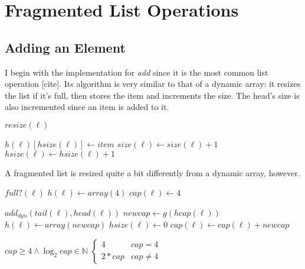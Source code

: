 \documentclass{article}
\begin{document}
	\section{Fragmented List Operations}
	\label{Fragmented List Operations}
	
	\subsection{Adding an Element}
	
	I begin with the implementation for \textit{add} since it is the most common list operation [cite]. Its algorithm is very similar to that of a dynamic array: it resizes the list if it's full, then stores the item and increments the size. The head's size is also incremented since an item is added to it.
	
	\begin{algorithm}\begin{algorithmic}[1]
					\State $resize(\ell)$
				\EndIf
				
				\State $h(\ell)[hsize(\ell)] \gets item$
				\State $size(\ell) \gets size(\ell) + 1$
				\State $hsize(\ell) \gets hsize(\ell) + 1$
			\EndProcedure
		\end{algorithmic}\end{algorithm}
	
	A fragmented list is resized quite a bit differently from a dynamic array, however. %
	
	\begin{algorithm}\begin{algorithmic}[1]
				\Require
					\Statex $full?(\ell)$
					\State $h(\ell) \gets array(4)$
					\State $cap(\ell) \gets 4$
					\State \Return
				\EndIf
			
				\State $add_{dyn}(tail(\ell), head(\ell))$
				\State $newcap \gets g(hcap(\ell))$
				\State $h(\ell) \gets array(newcap)$
				\State $hsize(\ell) \gets 0$
				\State $cap(\ell) \gets cap(\ell) + newcap$
			\EndProcedure
		\end{algorithmic}\end{algorithm}
	
	\begin{algorithm}\begin{algorithmic}[1]
			\Require
			\Statex $cap \geq 4 \land \log_2{cap} \in \mathbb{N}$
			\State \Return $\begin{cases}
			4 & cap = 4\\
			2 * cap & cap \neq 4
			\end{cases}$
			\EndFunction
		\end{algorithmic}\end{algorithm}
	
\end{document}
